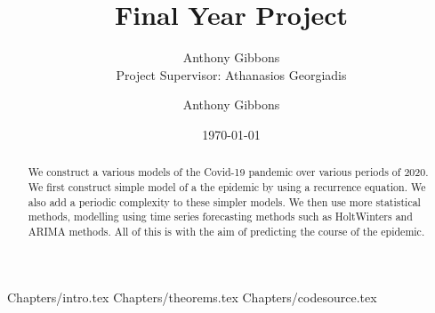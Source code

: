 \documentclass[a4paper]{article}
\title{Final Year Project}
\author{Anthony Gibbons \qquad 17322353 \\ Project Supervisor: Athanasios Georgiadis}
\author{Anthony Gibbons}
\date{\today}
\begin{document}
\maketitle      

\begin{abstract}
    We construct a various models of the Covid-19 pandemic over various periods of 2020. We first construct simple model of a the epidemic by using a recurrence equation. We also add a periodic complexity to these simpler models. We then use more statistical methods, modelling using time series forecasting methods such as HoltWinters and ARIMA methods. All of this is with the aim of predicting the course of the epidemic.
\end{abstract}
\hypersetup{
    linkcolor=blue,
}
{Chapters/intro.tex}
{Chapters/theorems.tex}
{Chapters/codesource.tex}

\printbibliography
\end{document}
